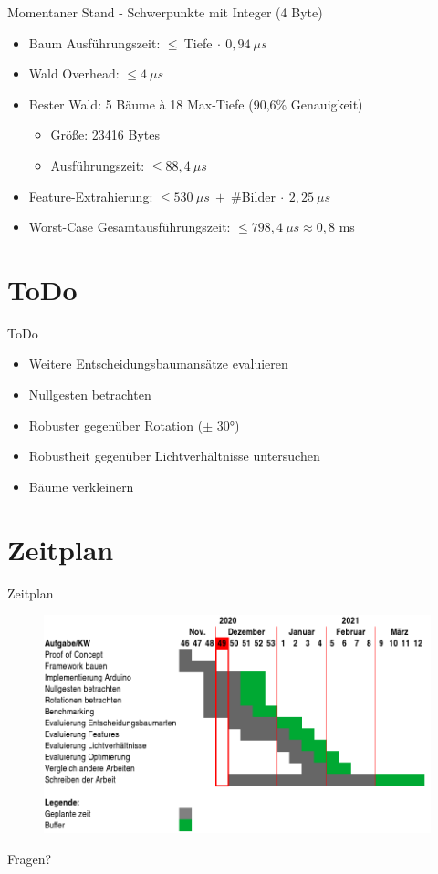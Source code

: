 \documentclass[10pt]{beamer}
\begin{document}
\begin{frame}{Momentaner Stand - Schwerpunkte mit Integer (4 Byte)}
\begin{figure}
\begin{minipage}[c]{0.49\linewidth}
    \end{minipage}%
\end{figure}
\begin{itemize}
    \item Baum Ausführungszeit: $\leq \ $Tiefe$\ \cdot \ 0,94\ \mu s$
    \item Wald Overhead: $\leq 4\ \mu s$
    \item Bester Wald: 5 Bäume à 18 Max-Tiefe (90,6\% Genauigkeit)
    \begin{itemize}
        \item Größe: 23416 Bytes
        \item Ausführungszeit: $\leq 88,4\ \mu s$
    \end{itemize}
    \item Feature-Extrahierung: $\leq 530\ \mu s\ +\ $\#Bilder$\ \cdot \ 2,25\ \mu s$
    \item Worst-Case Gesamtausführungszeit: $\leq 798,4\ \mu s \approx 0,8$ ms
\end{itemize}
\end{frame}

\section{ToDo}
\begin{frame}{ToDo}
\begin{itemize}
    \item Weitere Entscheidungsbaumansätze evaluieren
    \item Nullgesten betrachten
    \item Robuster gegenüber Rotation ($\pm$ 30°)
    \item Robustheit gegenüber Lichtverhältnisse untersuchen
    \item Bäume verkleinern
\end{itemize}
\end{frame}

\section{Zeitplan}
\begin{frame}{Zeitplan}
\begin{figure}
    \centering
    \includegraphics[width=\linewidth]{gantt_chart.png}
\end{figure}
\end{frame}
\begin{frame}[standout]
  Fragen?
\end{frame}
\end{document}
